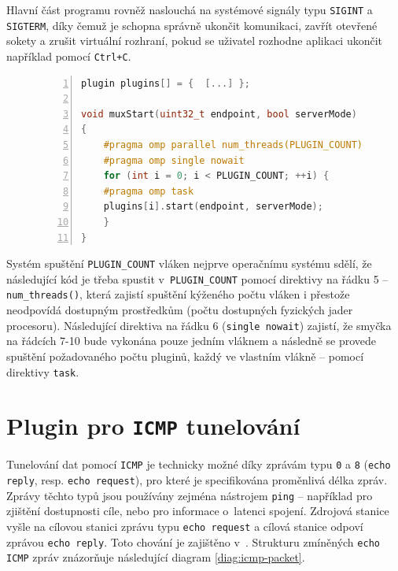 \documentclass[thesis=M,czech]{FITthesis}[2012/10/20]
\begin{document}
Hlavní část programu rovněž naslouchá na systémové signály typu \texttt{SIGINT} a \texttt{SIGTERM}, díky čemuž je schopna správně ukončit komunikaci, zavřít otevřené sokety a zrušit virtuální rozhraní, pokud se uživatel rozhodne aplikaci ukončit například pomocí \texttt{Ctrl+C}.

    \begin{figure}[h]
	\begin{lstlisting}[caption=Výňatek souboru \texttt{src/mux.c} znázorňující jednoduchost užití knihovny \texttt{OpenMP} pro správu vláken pluginů,language=c,frame=single,numbers=left]
plugin plugins[] = {  [...] };

void muxStart(uint32_t endpoint, bool serverMode)
{
    #pragma omp parallel num_threads(PLUGIN_COUNT)
    #pragma omp single nowait
    for (int i = 0; i < PLUGIN_COUNT; ++i) {
	#pragma omp task
	plugins[i].start(endpoint, serverMode);
    }
}
      \end{lstlisting}
      \label{code:mux-start}
    \end{figure}
    
Systém spuštění \texttt{PLUGIN\_COUNT} vláken nejprve operačnímu systému sdělí, že následující kód je třeba spustit v~\texttt{PLUGIN\_COUNT} pomocí direktivy na řádku 5 -- \texttt{num\_threads()}, která zajistí spuštění kýženého počtu vláken i přestože neodpovídá dostupným prostředkům (počtu dostupných fyzických jader procesoru). Následující direktiva na řádku 6 (\texttt{single nowait}) zajistí, že smyčka na řádcích 7-10 bude vykonána pouze jedním vláknem a následně se provede spuštění požadovaného počtu pluginů, každý ve vlastním vlákně -- pomocí direktivy \texttt{task}.


\section{Plugin pro \texttt{ICMP} tunelování}

Tunelování dat pomocí \texttt{ICMP} je technicky možné díky zprávám typu \texttt{0} a \texttt{8} (\texttt{echo reply}, resp. \texttt{echo request}), pro které je specifikována proměnlivá délka zpráv. Zprávy těchto typů jsou používány zejména nástrojem \texttt{ping} -- například pro zjištění dostupnosti cíle, nebo pro informace o~latenci spojení. Zdrojová stanice vyšle na cílovou stanici zprávu typu \texttt{echo request} a cílová stanice odpoví zprávou \texttt{echo reply}. Toto chování je zajištěno v~\cite[RFC1122]{rfc1122}. Strukturu zmíněných \texttt{echo} \texttt{ICMP} zpráv znázorňuje následující diagram \ref{diag:icmp-packet}.
\end{document}
